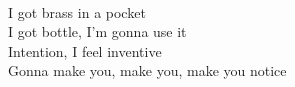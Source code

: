 \\
I got brass in a pocket \\
I got bottle, I'm gonna use it \\
Intention, I feel inventive \\
Gonna make you, make you, make you notice \\
